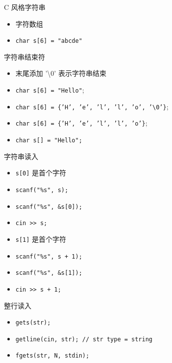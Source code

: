 \begin{frame}{C 风格字符串}
\begin{itemize}
    \item 字符数组
    \item \texttt{char s[6] = "abcde"}
\end{itemize}
\end{frame}

\begin{frame}{字符串结束符}
\begin{itemize}
    \item 末尾添加 '\textbackslash 0' 表示字符串结束
    \item \texttt{char s[6] = "Hello"};
    \item \texttt{char s[6] = \{'H', 'e', 'l', 'l', 'o', '\textbackslash 0'\}};
    \item \texttt{char s[6] = \{'H', 'e', 'l', 'l', 'o'\}};
    \item \texttt{char s[] = "Hello";}
\end{itemize}
\end{frame}

\begin{frame}{字符串读入}
\begin{itemize}
    \item \texttt{s[0]} 是首个字符
    \item \texttt{scanf("\%s", s);}
    \item \texttt{scanf("\%s", \&s[0]);}
    \item \texttt{cin >> s;}
\end{itemize}

\begin{itemize}
    \item \texttt{s[1]} 是首个字符
    \item \texttt{scanf("\%s", s + 1);}
    \item \texttt{scanf("\%s", \&s[1]);}
    \item \texttt{cin >> s + 1;}
\end{itemize}
\end{frame}

\begin{frame}{整行读入}
\begin{itemize}
    \item \texttt{gets(str);}
    \item \texttt{getline(cin, str); // str type = string}
    \item \texttt{fgets(str, N, stdin);}
\end{itemize}
\end{frame}

